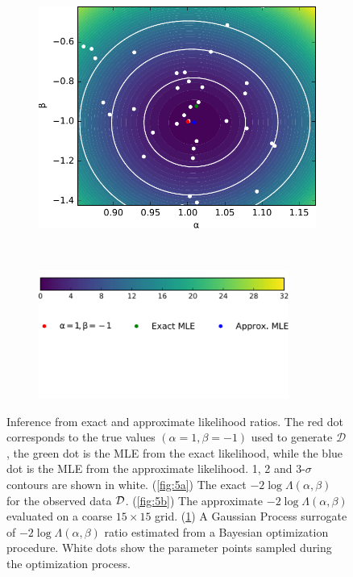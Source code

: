 \documentclass[12pt]{article}
\numberwithin{equation}{section}
\theoremstyle{plain}
\begin{document}
\begin{figure}
    \begin{subfigure}[t]{0.43\textwidth}
        \centering
        \includegraphics[width=\textwidth]{figures/fig5c.pdf}
        \caption{ }
        \label{fig:5c}
    \end{subfigure}
    ~
    \begin{subfigure}[t]{0.43\textwidth}
        \centering
        \hfill\includegraphics[width=0.9\textwidth]{figures/fig5d.pdf}
        \caption{ }
        \label{fig:5d}
    \end{subfigure}
    \caption{Inference from exact and approximate likelihood ratios. The red dot corresponds
    to the true values $(\alpha=1, \beta=-1)$ used to generate $\mathcal{D}$, the green dot is the MLE
     from the exact likelihood, while the blue dot is the MLE  from the approximate likelihood.
    1, 2 and 3-$\sigma$ contours are shown in white.
             (\ref{fig:5a}) The exact $-2\log\Lambda(\alpha,\beta)$ for the observed data ${\cal D}$.
             (\ref{fig:5b}) The approximate $-2\log\Lambda(\alpha,\beta)$ evaluated on a coarse $15 \times 15$  grid.
             (\ref{fig:5c}) A Gaussian Process surrogate of $-2\log\Lambda(\alpha,\beta)$ ratio estimated from a Bayesian optimization procedure. White dots show the  parameter points sampled during the optimization process.}
    \label{fig:5}
\end{figure}
\end{document}
